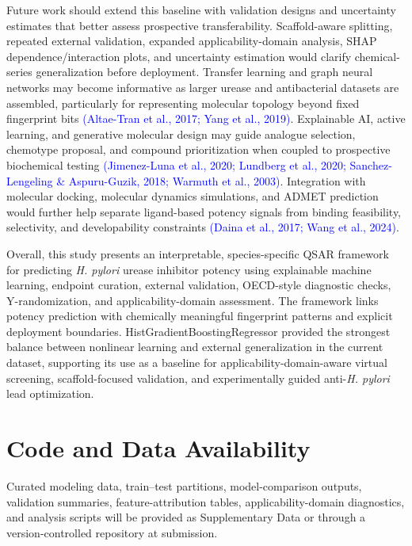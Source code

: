 \documentclass[11pt]{article}
\begin{document}
Future work should extend this baseline with validation designs and uncertainty estimates that better assess prospective transferability. Scaffold-aware splitting, repeated external validation, expanded applicability-domain analysis, SHAP dependence/interaction plots, and uncertainty estimation would clarify chemical-series generalization before deployment. Transfer learning and graph neural networks may become informative as larger urease and antibacterial datasets are assembled, particularly for representing molecular topology beyond fixed fingerprint bits \textcolor{blue}{(Altae-Tran et al., 2017; Yang et al., 2019)}. Explainable AI, active learning, and generative molecular design may guide analogue selection, chemotype proposal, and compound prioritization when coupled to prospective biochemical testing \textcolor{blue}{(Jimenez-Luna et al., 2020; Lundberg et al., 2020; Sanchez-Lengeling \& Aspuru-Guzik, 2018; Warmuth et al., 2003)}. Integration with molecular docking, molecular dynamics simulations, and ADMET prediction would further help separate ligand-based potency signals from binding feasibility, selectivity, and developability constraints \textcolor{blue}{(Daina et al., 2017; Wang et al., 2024)}.

Overall, this study presents an interpretable, species-specific QSAR framework for predicting \textit{H. pylori} urease inhibitor potency using explainable machine learning, endpoint curation, external validation, OECD-style diagnostic checks, Y-randomization, and applicability-domain assessment. The framework links potency prediction with chemically meaningful fingerprint patterns and explicit deployment boundaries. HistGradientBoostingRegressor provided the strongest balance between nonlinear learning and external generalization in the current dataset, supporting its use as a baseline for applicability-domain-aware virtual screening, scaffold-focused validation, and experimentally guided anti-\textit{H. pylori} lead optimization.

\section*{Code and Data Availability}

Curated modeling data, train--test partitions, model-comparison outputs, validation summaries, feature-attribution tables, applicability-domain diagnostics, and analysis scripts will be provided as Supplementary Data or through a version-controlled repository at submission.
\end{document}
